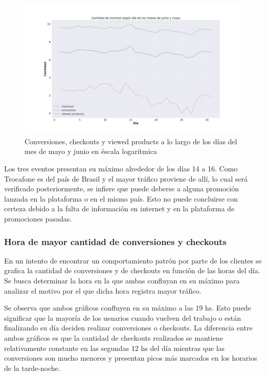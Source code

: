\documentclass[a4paper]{article}
\begin{document}
\begin{figure}[h!]
	\includegraphics[width=\linewidth]{figures/033-eventos_mayo_junio_lineplot.png}
	\caption{Conversiones, checkouts y viewed products a lo largo de los días del mes de mayo y junio en éscala logarítmica}
	\label{mayojunio}
\end{figure}

Los tres eventos presentan su máximo alrededor de los días 14 a 16. Como Trocafone es del país de Brasil y el mayor tráfico proviene de allí, lo cual será verificado posteriormente, se infiere que puede deberse a alguna promoción lanzada en la plataforma o en el mismo país. Esto no puede concluirse con certeza debido a la falta de información en internet y en la plataforma de promociones pasadas.

\subsubsection{Hora de mayor cantidad de conversiones y checkouts}

En un intento de encontrar un comportamiento patrón por parte de los clientes se grafica la cantidad de conversiones y de checkouts en función de las horas del día. Se busca determinar la hora en la que ambas confluyan en su máximo para analizar el motivo por el que dicha hora registra mayor tráfico.

Se observa que ambos gráficos confluyen en su máximo a las 19 hs. Esto puede significar que la mayoría de los usuarios cuando vuelven del trabajo o están finalizando su día deciden realizar conversiones o checkouts. La diferencia entre ambos gráficos es que la cantidad de checkouts realizados se mantiene relativamente constante en las segundas 12 hs del día mientras que las conversiones son mucho menores y presentan picos más marcados en los horarios de la tarde-noche. 
\end{document}
